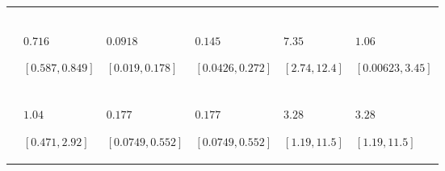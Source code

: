 \begin{table}
\centering
\begin{tabular}{>{\raggedleft\arraybackslash}m{1.2cm}>{\raggedright\arraybackslash}m{2.3cm}>{\raggedright\arraybackslash}m{2.3cm}>{\raggedright\arraybackslash}m{2.3cm}ll}
\toprule
\multicolumn{1}{c}{\cellcolor{blue!15!gray}{}} & \multicolumn{1}{c}{\cellcolor{blue!15!gray}{$L_{0}$}} & \multicolumn{2}{c}{\cellcolor{blue!15!gray}{$k$}} & \multicolumn{2}{c}{\cellcolor{blue!15!gray}{$L_{\infty}$}} \\
\cellcolor{blue!15!gray}{Estimate} & \cellcolor{blue!15!gray}{Both} & \cellcolor{blue!15!gray}{Female} & \cellcolor{blue!15!gray}{Male} & \cellcolor{blue!15!gray}{Female} & \cellcolor{blue!15!gray}{Male}\\
\midrule
\cellcolor{blue!5!white!90!black}{$\mu$} & \cellcolor{gray}{$21.8$\par $[21.2,22.5]$} & \cellcolor{gray}{$2.32$\par $[2.03,2.62]$} & \cellcolor{gray}{$2.65$\par $[2.35,2.95]$} & \cellcolor{gray}{$62.7$\par $[61.2,64]$} & \cellcolor{gray}{$56$\par $[54.6,57.3]$}\\
\cellcolor{blue!5!white!90!black}{$V_{\text{A}}$} & $0.716$\par $[0.587,0.849]$ & $0.0918$\par $[0.019,0.178]$ & $0.145$\par $[0.0426,0.272]$ & $7.35$\par $[2.74,12.4]$ & $1.06$\par $[0.00623,3.45]$\\
\cellcolor{blue!5!white!90!black}{$V_{\text{M}}$} & \cellcolor{gray}{$0.951$\par $[0.803,1.12]$} & \cellcolor{gray}{$0.0665$\par $[0.0309,0.11]$} & \cellcolor{gray}{$0.0665$\par $[0.0309,0.11]$} & \cellcolor{gray}{$1.39$\par $[0.293,2.67]$} & \cellcolor{gray}{$1.39$\par $[0.293,2.67]$}\\
\cellcolor{blue!5!white!90!black}{$V_{\text{Y}}$} & $1.04$\par $[0.471,2.92]$ & $0.177$\par $[0.0749,0.552]$ & $0.177$\par $[0.0749,0.552]$ & $3.28$\par $[1.19,11.5]$ & $3.28$\par $[1.19,11.5]$\\

\end{tabular}
\end{table}

